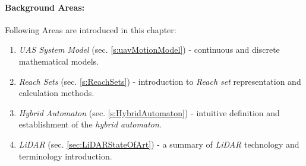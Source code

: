 \paragraph{Background Areas:} Following Areas are introduced in this chapter:
\begin{enumerate}
    \item \emph{UAS System Model} (sec. \ref{s:uavMotionModel}) - continuous and discrete mathematical models.
    
    \item \emph{Reach Sets} (sec. \ref{s:ReachSets}) - introduction to \emph{Reach set} representation and calculation methods.
    
    \item \emph{Hybrid Automaton} (sec. \ref{s:HybridAutomaton}) - intuitive definition and establishment of the \emph{hybrid automaton}.
    
    \item \emph{LiDAR} (sec. \ref{sec:LiDARStateOfArt}) - a summary of \emph{LiDAR} technology and terminology introduction.
\end{enumerate}
